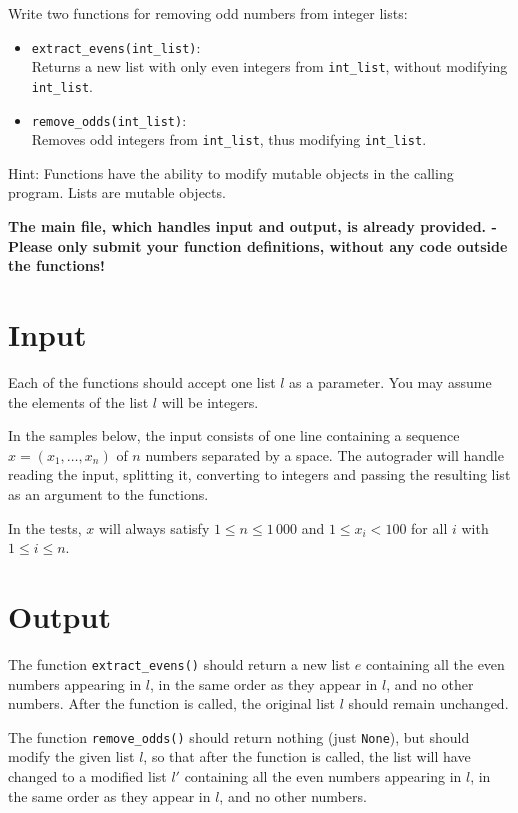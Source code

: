 

Write two functions for removing odd numbers from integer lists:

\begin{itemize}
    \item
    \texttt{extract\_evens(int\_list)}:\\
    Returns a new list
    with only even integers from \texttt{int\_list},
    without modifying \texttt{int\_list}.

    \item
    \texttt{remove\_odds(int\_list)}:\\
    Removes odd integers from \texttt{int\_list},
    thus modifying \texttt{int\_list}.
\end{itemize}

Hint: Functions have the ability to modify mutable objects in the calling program.
Lists are mutable objects.

\textbf{The main file, which handles input and output, is already provided. -
Please only submit your function definitions, without any code outside the functions!}


\section*{Input}

Each of the functions should accept one list $l$ as a parameter.
You may assume the elements of the list $l$ will be integers.

In the samples below, the input consists of one line
containing a sequence $x = (x_1, \dots, x_n)$ of $n$ numbers
separated by a space.
The autograder will handle reading the input,
splitting it, converting to integers
and passing the resulting list as an argument to the functions.

In the tests, $x$ will always satisfy $1 \le n \le 1\,000$
and $1 \le x_i < 100$ for all $i$ with $1 \le i \le n$.

\section*{Output}

The function \texttt{extract\_evens()}
should return a new list $e$
containing all the even numbers appearing in $l$,
in the same order as they appear in $l$,
and no other numbers.
After the function is called,
the original list $l$ should remain unchanged.

The function \texttt{remove\_odds()}
should return nothing (just \texttt{None}),
but should modify the given list $l$,
so that after the function is called,
the list will have changed to a modified list $l'$
containing all the even numbers appearing in $l$,
in the same order as they appear in $l$,
and no other numbers.

